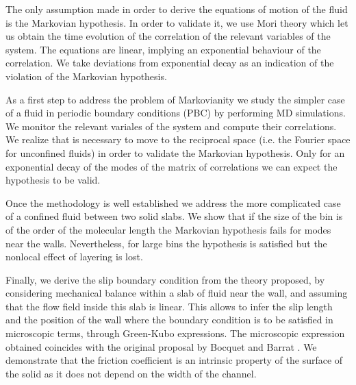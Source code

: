 \documentclass[b5paper,openright,10pt]{book}
\begin{document}
The only assumption made in order to derive the equations of motion of the fluid is the Markovian hypothesis. In order to validate it, we use  Mori theory which let us obtain the time evolution of the correlation of the relevant variables of the system. 
The equations are linear, implying an exponential behaviour of the correlation. We take deviations from exponential decay as an indication of the violation of the Markovian hypothesis.

As a first step to address the problem of Markovianity we study the simpler case of a fluid in periodic boundary conditions (PBC) by  performing MD simulations. We monitor the relevant variales of the system  and compute their correlations. 
We realize that is necessary to move to the reciprocal space (i.e. the Fourier space for unconfined fluids) in order to validate the Markovian hypothesis. Only for an exponential decay of the modes of the matrix of correlations we can expect the hypothesis to be valid. 

Once the methodology is well established we address the more complicated case of a confined fluid between two solid slabs.
 We show that if the size of the bin is of the order of the molecular length the Markovian hypothesis fails for modes near the walls. Nevertheless, for large bins the hypothesis is satisfied but the nonlocal effect of layering is lost. 


Finally, we derive the slip boundary condition from the theory proposed, by considering mechanical balance within a slab of fluid near the wall, and assuming that the flow field inside this slab is linear. This allows to infer the slip length and the position of the wall where the boundary condition is to  be satisfied in microscopic terms, through Green-Kubo expressions. The microscopic expression obtained coincides with the original proposal by Bocquet and Barrat \cite{Bocquet1994}. We demonstrate that the friction coefficient is an intrinsic property of the surface of the solid as it does not depend on the width of the channel.
\end{document}
